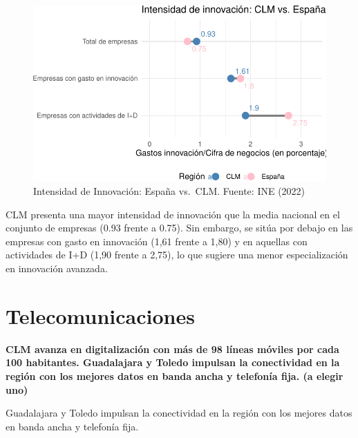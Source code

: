 \documentclass[
  10pt,
  a4paper,
  DIV=11,
  numbers=noendperiod]{scrreprt}
\begin{document}
\begin{figure}

{\centering \includegraphics{clm01_ciencia_tecnologia_files/figure-pdf/lollipop-innovacion-1.pdf}

}

\caption{Intensidad de Innovación: España vs.~CLM. Fuente: INE (2022)}

\end{figure}

CLM presenta una mayor intensidad de innovación que la media nacional en
el conjunto de empresas (0.93 frente a 0.75). Sin embargo, se sitúa por
debajo en las empresas con gasto en innovación (1,61 frente a 1,80) y en
aquellas con actividades de I+D (1,90 frente a 2,75), lo que sugiere una
menor especialización en innovación avanzada.

\hypertarget{telecomunicaciones}{%
\section{Telecomunicaciones}\label{telecomunicaciones}}

\textbf{CLM avanza en digitalización con más de 98 líneas móviles por
cada 100 habitantes. Guadalajara y Toledo impulsan la conectividad en la
región con los mejores datos en banda ancha y telefonía fija. (a elegir
uno)}

\begin{tcolorbox}[enhanced jigsaw, leftrule=.75mm, breakable, toptitle=1mm, colframe=quarto-callout-note-color-frame, left=2mm, colback=white, bottomrule=.15mm, title=\textcolor{quarto-callout-note-color}{\faInfo}\hspace{0.5em}{CLM avanza en digitalización con más de 98 líneas móviles por cada 100
habitantes.}, arc=.35mm, coltitle=black, colbacktitle=quarto-callout-note-color!10!white, toprule=.15mm, bottomtitle=1mm, opacityback=0, titlerule=0mm, rightrule=.15mm, opacitybacktitle=0.6]

Guadalajara y Toledo impulsan la conectividad en la región con los
mejores datos en banda ancha y telefonía fija.

\end{tcolorbox}
\end{document}
